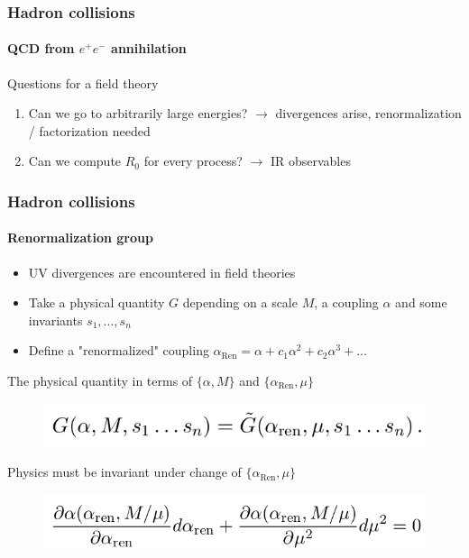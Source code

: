 \documentclass[aspectratio=43]{beamer}
\begin{document}
\begin{frame}
	
	\frametitle{Hadron collisions}
	\framesubtitle{QCD from $e^{+}e^{-}$ annihilation}
	
	Questions for a field theory
	\begin{enumerate}
		\item Can we go to arbitrarily large energies? $\rightarrow$ divergences arise, renormalization / factorization needed
		\item Can we compute $R_{0}$ for every process? $\rightarrow$ IR observables
	\end{enumerate}	

\end{frame}

\begin{frame}

	\frametitle{Hadron collisions}
	\framesubtitle{Renormalization group}
	
	\begin{itemize}
		\item UV divergences are encountered in field theories
		\item Take a physical quantity $G$ depending on a scale $M$, a coupling $\alpha$ and some invariants $s_{1}, ..., s_{n}$	
		\item Define a "renormalized" coupling $\alpha_{\textrm{Ren}} = \alpha + c_{1}\alpha^{2} + c_{2}\alpha^{3} + ...$
	\end{itemize}
 
	The physical quantity in terms of $\{\alpha, M\}$ and $\{\alpha_{\textrm{Ren}}, \mu\}$ 
	\begin{figure}
		\includegraphics[width = 7 cm]{plots/eq_RGE.png}
	\end{figure}

	{\color{blue}Physics must be invariant under change of $\{\alpha_{\textrm{Ren}}, \mu\}$}
	\begin{figure}
		\includegraphics[width = 7 cm]{plots/eq_RGE_2.png}
	\end{figure}

\end{frame}
\end{document}
